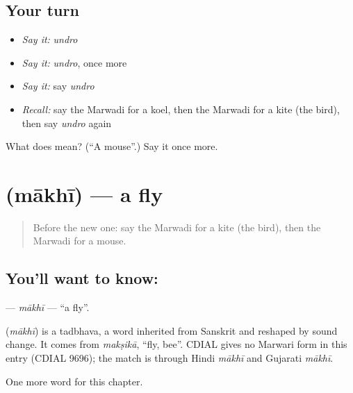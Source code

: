 \subsection*{Your turn}
\begin{itemize}
\raggedright
  \item \emph{Say it:} \emph{undro}
  \item \emph{Say it:} \emph{undro}, once more
  \item \emph{Say it:} say \emph{undro}
  \item \emph{Recall:} say the Marwadi for a koel, then the Marwadi for a kite (the bird), then say \emph{undro} again
\end{itemize}

\begin{tcolorbox}[breakable,colback=teal!4,colframe=teal!35!black,title={Before you move on}]
What does  mean? (\textquotedblleft{}A mouse\textquotedblright{}.) Say it once more.
\end{tcolorbox}
\section[\texorpdfstring{\mw{माखी} (mākhī)}{माखी (mākhī)}]{ (mākhī) — a fly}

\label{lesson:MW-C140-makhi}



\begin{quote}
Before the new one: say the Marwadi for a kite (the bird), then the Marwadi for a mouse.
\end{quote}

\subsection*{You'll want to know: }
\textbf{} — \emph{mākhī} — \textquotedblleft{}a fly\textquotedblright{}.

\begin{cousinweb}
\textbf{} (\emph{mākhī}) is a tadbhava, a word inherited from Sanskrit and reshaped by sound change. It comes from \emph{makṣikā}, \textquotedblleft{}fly, bee\textquotedblright{}. CDIAL gives no Marwari form in this entry (CDIAL 9696); the match is through Hindi \emph{mākhī} and Gujarati \emph{mākhī}.
\end{cousinweb}

\begin{grammarlens}[title={What you've built}]
One more word for this chapter.
\end{grammarlens}

